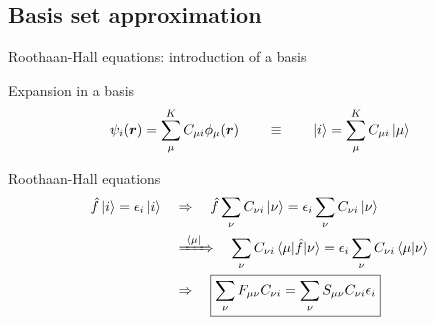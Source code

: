 \documentclass[aspectratio=169,9pt]{beamer}
\newcommand{\br}{\boldsymbol{r}}
\newcommand{\hf}{\hat{f}}
\newcommand{\orange}[1]{\textcolor{hfOrange}{#1}}
\newcommand{\blue}[1]{\textcolor{hfBlue}{#1}}
\begin{document}
\subsection{Basis set approximation}
\begin{frame}{Roothaan-Hall equations: introduction of a basis}
	\begin{block}{Expansion in a basis}
		$$ \psi_i(\br) = \sum_\mu^K C_{\mu i} \phi_{\mu}(\br)	
		\qquad \equiv	\qquad
		\ket{i} = \sum_\mu^K C_{\mu i} \ket{\mu}$$
	\end{block}
	\begin{block}{Roothaan-Hall equations}
			\begin{equation*}
			\begin{split}
				\hf \ket{i} = \epsilon_i \ket{i}
				&  \quad	\Rightarrow	\quad
				\hf \sum_{\nu} C_{\nu i} \ket{\nu} = \epsilon_i \sum_{\nu} C_{\nu i} \ket{\nu}
				\\
				& \quad\xRightarrow{\ \bra{\mu}\ }\quad
				\sum_{\nu} C_{\nu i} \mel{ \mu }{ \hf }{ \nu }
				= \epsilon_i \sum_{\nu} C_{\nu i} \braket{ \mu }{ \nu }
				\\
				& \quad	\Rightarrow	\quad
				 \boxed{\sum_{\nu} F_{\mu \nu}  C_{\nu i} = \sum_{\nu}  S_{\mu \nu} C_{\nu i} \epsilon_i }
			\end{split}
			\end{equation*}
	\end{block}
\end{frame}
\end{document}
